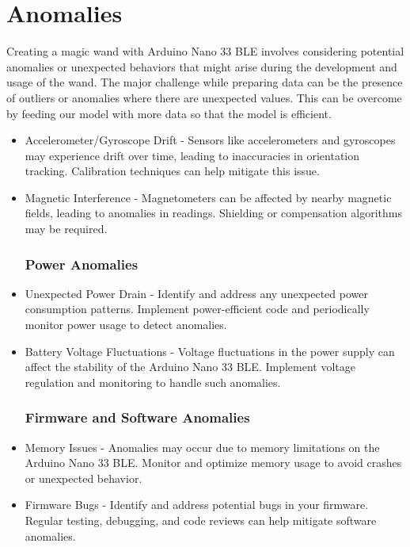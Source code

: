 \section{Anomalies}
	Creating a magic wand with Arduino Nano 33 BLE involves considering potential anomalies or unexpected behaviors that might arise during the development and usage of the wand. The major challenge while preparing data can be the presence of outliers or anomalies where there are unexpected values. This can be overcome by feeding our model with more data so that the model is efficient.\cite{War:2020}
\begin{itemize}
\subsubsection{Sensor Anomalies}

	\item Accelerometer/Gyroscope Drift
	- Sensors like accelerometers and gyroscopes may experience drift over time, leading to inaccuracies in orientation tracking. Calibration techniques can help mitigate this issue.\cite{Chow:2021}
	\item {Magnetic Interference}
	- Magnetometers can be affected by nearby magnetic fields, leading to anomalies in readings. Shielding or compensation algorithms may be required.
\subsubsection{Power Anomalies}
	\item Unexpected Power Drain
	- Identify and address any unexpected power consumption patterns. Implement power-efficient code and periodically monitor power usage to detect anomalies.
	\item Battery Voltage Fluctuations
	- Voltage fluctuations in the power supply can affect the stability of the Arduino Nano 33 BLE. Implement voltage regulation and monitoring to handle such anomalies. 
\subsubsection{Firmware and Software Anomalies}
	\item Memory Issues
	- Anomalies may occur due to memory limitations on the Arduino Nano 33 BLE. Monitor and optimize memory usage to avoid crashes or unexpected behavior.
	\item Firmware Bugs
	-  Identify and address potential bugs in your firmware. Regular testing, debugging, and code reviews can help mitigate software anomalies.
\end{itemize}
